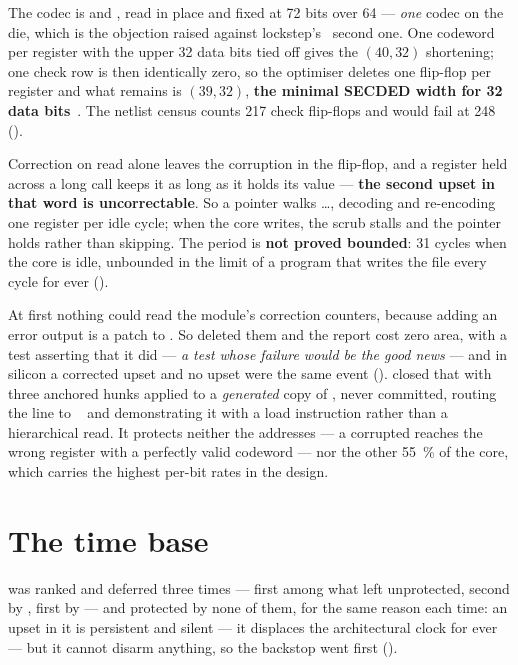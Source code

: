 The codec is  and , read
in place and fixed at 72 bits over 64 --- \emph{one} codec on the die,
which is the objection  raised against lockstep's~\cite{tcls2019}
second one.
One codeword per register with the upper 32 data bits tied off gives the
$(40,32)$ shortening; one check row is then identically zero, so the
optimiser deletes one flip-flop per register and what remains is
$(39,32)$, \textbf{the minimal SECDED width for
32 data bits}~\cite{hsiao1970}. The netlist census counts 217 check flip-flops and
would fail at 248 ().

Correction on read alone leaves the corruption in the flip-flop, and a
register held across a long call keeps it as long as it holds its value
--- \textbf{the second upset in that word is uncorrectable}. So a
pointer walks \dots{}, decoding and re-encoding one
register per idle cycle; when the core writes, the scrub stalls and the
pointer holds rather than skipping. The period is \textbf{not proved
bounded}: 31 cycles when the core is idle, unbounded in the limit of a
program that writes the file every cycle for ever
().

At first nothing could read the module's correction counters, because
adding an error output is a patch to . So
 deleted them and the report cost zero area, with a
test asserting that it did --- \emph{a test whose failure would be the
good news} --- and in silicon a corrected upset and no upset were the
same event ().  closed that with three
anchored hunks applied to a \emph{generated} copy of ,
never committed, routing the line to ~\cite{santos2023} and
demonstrating it with a load instruction rather than a hierarchical
read. It protects neither the addresses --- a corrupted 
reaches the wrong register with a perfectly valid codeword --- nor the
other \SI{55}{\percent} of the core, which carries the highest per-bit
rates in the design.

\section{The time base}
\label{sec:harden-mtime}

 was ranked and deferred three times --- first among what
 left unprotected, second by ,
first by  --- and
protected by none of them, for the same reason each time: an upset in it is
persistent and silent --- it displaces the architectural clock for ever
--- but it cannot disarm anything, so the backstop went first
().

